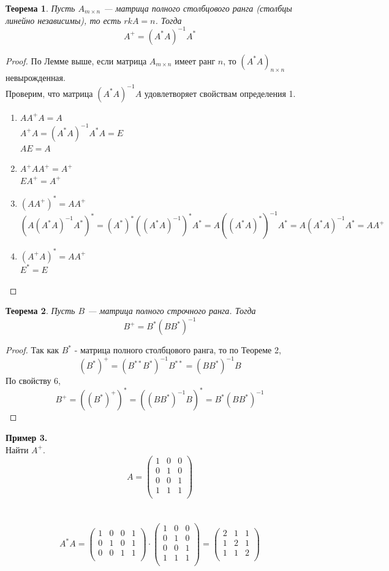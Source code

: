 \documentclass[12pt]{article}
\newtheorem*{theorem}{Теорема}
\begin{document}
	\begin{theorem}
		Пусть $A_{m \times n}$ --- матрица полного столбцового ранга (столбцы линейно независимы), то есть $rkA=n$. Тогда $$A^+=(A^*A)^{-1}A^*$$
	\end{theorem}
	\begin{proof}
		По Лемме выше, если матрица $A_{m\times n}$ имеет ранг $n$, то $(A^*A)_{n\times n}$ невырожденная.\\
	Проверим, что матрица $(A^*A)^{-1}A$ удовлетворяет свойствам определения 1.
	\begin{enumerate}
		\item $AA^+A=A$\\
		$A^+A=(A^*A)^{-1}A^*A=E$\\
		$AE=A$
		\item $A^+AA^+=A^+$\\
		$EA^+=A^+$
		\item $(AA^+)^*=AA^+$\\
		$(A(A^*A)^{-1}A^*)^*=(A^*)^*((A^*A)^{-1})^*A^*=A((A^*A)^*)^{-1}A^*=A(A^*A)^{-1}A^*=AA^+$
		\item $(A^+A)^*=AA^+$\\
		$E^*=E $
	\end{enumerate}
	\end{proof}
	\begin{theorem}
		Пусть $B$ --- матрица полного строчного ранга. Тогда $$B^+=B^*(BB^*)^{-1}$$
	\end{theorem}
	\begin{proof}
		Так как $B^*$ - матрица полного столбцового ранга, то по Теореме 2,\\
	$$(B^*)^+=(B^{**}B^*)^{-1}B^{**}
	=(BB^*)^{-1}B$$
	По свойству 6,
	$$B^+=((B^*)^+)^*=((BB^*)^{-1}B)^*=B^*(BB^*)^{-1}$$
	\end{proof}
	\textbf{Пример 3.}\\
	Найти $A^+$.\\
	\[A = \begin{pmatrix}
	1 & 0 & 0 \\         
	0 & 1 & 0 \\
	0 & 0 & 1 \\
	1 & 1 & 1 \\
	\end{pmatrix}\]\\
	\\
	\[A^*A = \begin{pmatrix}
	1 & 0 & 0 & 1 \\         
	0 & 1 & 0 & 1\\
	0 & 0 & 1 & 1\\
	\end{pmatrix} \cdot \begin{pmatrix}
	1 & 0 & 0 \\         
	0 & 1 & 0 \\
	0 & 0 & 1 \\
	1 & 1 & 1 \\
	\end{pmatrix} = \begin{pmatrix}
	2 & 1 & 1 \\         
	1 & 2 & 1 \\
	1 & 1 & 2 \\
	\end{pmatrix}\]\\
\end{document}
